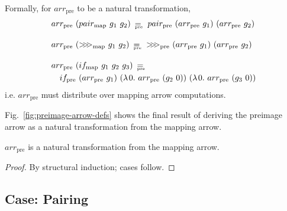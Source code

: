 \documentclass[preprint]{sigplanconf}
\newcommand{\arrowarr}{\ensuremath{arr}}
\newcommand{\arrowcomp}{\ensuremath{{>}\mspace{-6mu}{>}\mspace{-6mu}{>}}}
\newcommand{\arrowpair}{\ensuremath{pair}}
\newcommand{\arrowif}{\ensuremath{if}}
\newcommand{\map}{_\mathrm{map}}
\newcommand{\compmap}{\arrowcomp\map}
\newcommand{\pairmap}{\arrowpair\map}
\newcommand{\ifmap}{\arrowif\map}
\newcommand{\pre}{_\mathrm{pre}}
\DeclareMathOperator{\eqpre}{=_{\mspace{-17mu}\pre}}
\newcommand{\arrpre}{\arrowarr\pre}
\newcommand{\comppre}{\arrowcomp\pre}
\newcommand{\pairpre}{\arrowpair\pre}
\newcommand{\ifpre}{\arrowif\pre}
\begin{document}
Formally, for $\arrpre$ to be a natural transformation,
\begin{align}
	&\begin{aligned}
		\arrpre~(\pairmap~g_1~g_2) \ \eqpre \ \pairpre~(\arrpre~g_1)~(\arrpre~g_2)
	\label{eqn:arrpre-distributes-over-pairmap}
	\end{aligned} \\
\nonumber \\[-6pt]
	&\begin{aligned}
		\arrpre~(\compmap~g_1~g_2) \ \eqpre \ \comppre~(\arrpre~g_1)~(\arrpre~g_2)
	\label{eqn:arrpre-distributes-over-compmap}
	\end{aligned} \\
\nonumber \\[-6pt]
	&\begin{aligned}
		&\arrpre~(\ifmap~g_1~g_2~g_3) \ \eqpre \ \\
		&\tab\ifpre~(\arrpre~g_1)~(\fun{0}{\arrpre~(g_2~0)})~(\fun{0}{\arrpre~(g_3~0)})
	\label{eqn:arrpre-distributes-over-compmap}
	\end{aligned}
\end{align}
i.e. $\arrpre$ must distribute over mapping arrow computations.

Fig.~\ref{fig:preimage-arrow-defs} shows the final result of deriving the preimage arrow as a natural transformation from the mapping arrow.

\begin{figure*}[t]\centering
\caption{Preimage arrow definitions.}
\label{fig:preimage-arrow-defs}
\end{figure*}

\begin{theorem}
$\arrpre$ is a natural transformation from the mapping arrow.
\end{theorem}
\begin{proof}
By structural induction; cases follow.
\end{proof}

\subsection{Case: Pairing}
\end{document}
